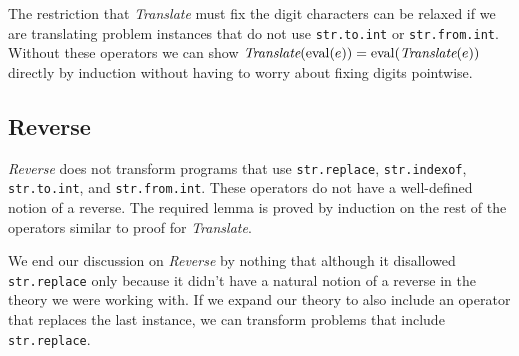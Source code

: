 The restriction that \textit{Translate} must fix the digit characters can be
relaxed if we are translating problem instances that do not use
\texttt{str.to.int} or \texttt{str.from.int}. Without these operators we can
show $\textit{Translate}(\operatorname{eval} (e)) = \operatorname{eval} (\textit{Translate}(e))$ directly by
induction without having to worry about fixing digits pointwise.

\subsection{Reverse}
\textit{Reverse} does not transform programs that use \texttt{str.replace},
\texttt{str.indexof}, \texttt{str.to.int}, and \texttt{str.from.int}. These
operators do not have a well-defined notion of a reverse. The required lemma is
proved by induction on the rest of the operators similar to proof for
\textit{Translate}.

We end our discussion on \textit{Reverse} by nothing that although it disallowed
\texttt{str.replace} only because it didn't have a natural notion of a reverse
in the theory we were working with. If we expand our theory to also include an
operator that replaces the last instance, we can transform problems that include
\texttt{str.replace}.
